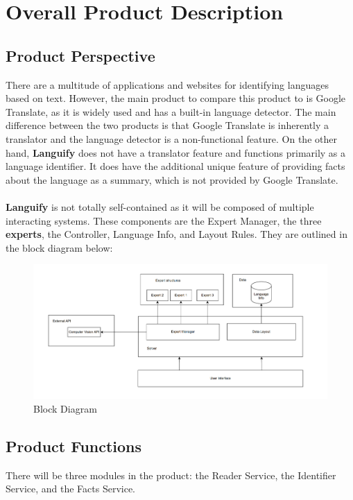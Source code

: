 \section{Overall Product Description}
\label{sec:overall_description}


\subsection{Product Perspective}
\label{sub:product_perspective}
There are a multitude of applications and websites for identifying languages based on text. However, the main product to compare this product to is Google Translate, 
as it is widely used and has a built-in language detector. The main difference between the two products is that Google Translate is inherently a translator
and the language detector is a non-functional feature. On the other hand, \textbf{Languify} does not have a translator feature and functions primarily as a language identifier.
It does have the additional unique feature of providing facts about the language as a summary, which is not provided by Google Translate. \\ \\
\textbf{Languify} is not totally self-contained as it will be composed of multiple interacting systems. These components are the Expert Manager, the three \textbf{experts}, 
the Controller, Language Info, and Layout Rules. They are outlined in the block diagram below:

\begin{figure}[H]
	\centering
	\includegraphics{Section2/Block_Diagram.png}
	\caption{Block Diagram}
	\label{BlockDiagram}
\end{figure}

\subsection{Product Functions}
\label{sub:product_functions}
There will be three modules in the product: the Reader Service, the Identifier Service, and the Facts Service.

